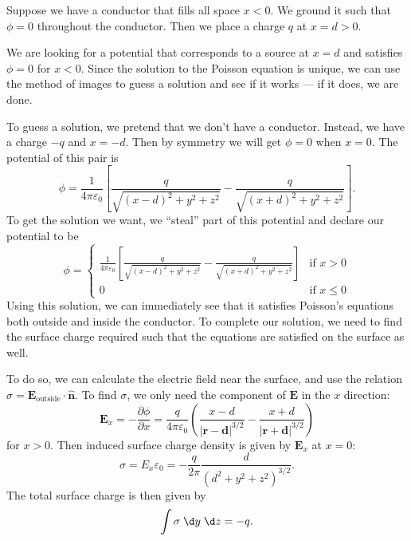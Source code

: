 \documentclass[a4paper]{article}
\begin{document}
\begin{eg}
  Suppose we have a conductor that fills all space $x < 0$. We ground it such that $\phi = 0$ throughout the conductor. Then we place a charge $q$ at $x = d > 0$.
  \begin{center}
  \end{center}
  We are looking for a potential that corresponds to a source at $x = d$ and satisfies $\phi = 0$ for $x < 0$. Since the solution to the Poisson equation is unique, we can use the method of images to guess a solution and see if it works --- if it does, we are done.

  To guess a solution, we pretend that we don't have a conductor. Instead, we have a charge $-q$ and $x = -d$. Then by symmetry we will get $\phi = 0$ when $x = 0$. The potential of this pair is
  \[
    \phi = \frac{1}{4\pi\varepsilon_0}\left[\frac{q}{\sqrt{(x - d)^2 + y^2 + z^2}} - \frac{q}{\sqrt{(x + d)^2 + y^2 + z^2}}\right].
  \]
  To get the solution we want, we ``steal'' part of this potential and declare our potential to be
  \[
    \phi =
    \begin{cases}
      \frac{1}{4\pi\varepsilon_0}\left[\frac{q}{\sqrt{(x - d)^2 + y^2 + z^2}} - \frac{q}{\sqrt{(x + d)^2 + y^2 + z^2}}\right] & \text{if }x > 0\\
    0 & \text{if }x \leq 0
    \end{cases}
  \]
  Using this solution, we can immediately see that it satisfies Poisson's equations both outside and inside the conductor. To complete our solution, we need to find the surface charge required such that the equations are satisfied on the surface as well.

  To do so, we can calculate the electric field near the surface, and use the relation $\sigma = \mathbf{E}_\text{outside}\cdot \hat{\mathbf{n}}$. To find $\sigma$, we only need the component of $\mathbf{E}$ in the $x$ direction:
  \[
    \mathbf{E}_x = -\frac{\partial \phi}{\partial x} = \frac{q}{4\pi\varepsilon_0}\left(\frac{x - d}{|\mathbf{r} - \mathbf{d}|^{3/2}} - \frac{x + d}{|\mathbf{r} + \mathbf{d}|^{3/2}}\right)
  \]
  for $x > 0$. Then induced surface charge density is given by $\mathbf{E}_x$ at $x = 0$:
  \[
    \sigma = E_x\varepsilon_0 = -\frac{q}{2\pi}\frac{d}{(d^2 + y^2 + z^2)^{3/2}}.
  \]
  The total surface charge is then given by
  \[
    \int \sigma \;\d y\;\d z = -q.
  \]
\end{eg}
\end{document}
